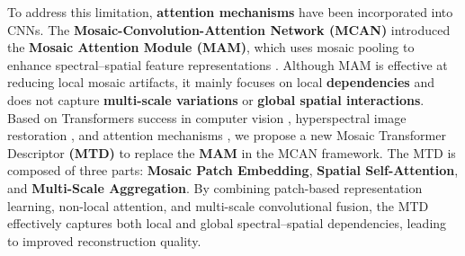 \documentclass[conference]{IEEEtran}
\begin{document}

To address this limitation, \textbf{attention mechanisms} have been incorporated into CNNs. The \textbf{Mosaic-Convolution-Attention Network (MCAN)} introduced the \textbf{Mosaic Attention Module (MAM)}, which uses mosaic pooling to enhance spectral–spatial feature representations \cite{Feng2021}. Although MAM is effective at reducing local mosaic artifacts, it mainly focuses on local \textbf{dependencies} and does not capture \textbf{multi-scale variations} or \textbf{global spatial interactions}. \\
Based on Transformers success in computer vision \cite{Vaswani2023}, hyperspectral image restoration \cite{Fu2024}, and attention mechanisms \cite{Liu2021}, we propose a new Mosaic Transformer Descriptor \textbf{(MTD)} to replace the \textbf{MAM} in the MCAN framework. The MTD is composed of three parts: \textbf{Mosaic Patch Embedding}, \textbf{Spatial Self-Attention}, and \textbf{Multi-Scale Aggregation}. By combining patch-based representation learning, non-local attention, and multi-scale convolutional fusion, the MTD effectively captures both local and global spectral–spatial dependencies, leading to improved reconstruction quality. \\
\end{document}
